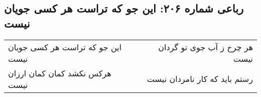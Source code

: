 \begin{center}
\section*{رباعی شماره ۲۰۶: این جو که تراست هر کسی جویان نیست}
\label{sec:0206}
\begin{longtable}{l p{0.5cm} r}
این جو که تراست هر کسی جویان نیست
&&
هر چرخ ز آب جوی تو گردان نیست
\\
هرکس نکشد کمان کمان ارزان نیست
&&
رستم باید که کار نامردان نیست
\\
\end{longtable}
\end{center}
